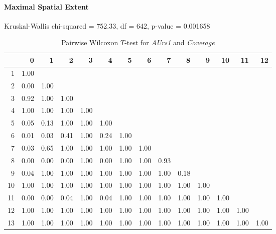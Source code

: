 \paragraph{Maximal Spatial Extent}
Kruskal-Wallis chi-squared = 752.33, df = 642, p-value = 0.001658

\begin{table}[ht]
	\small
	\centering
	\begin{tabular}{rrrrrrrrrrrrrr}
		\hline
	   & 0 & 1 & 2 & 3 & 4 & 5 & 6 & 7 & 8 & 9 & 10 & 11 & 12 \\ 
		\hline
	  1 & 1.00 &  &  &  &  &  &  &  &  &  &  &  &  \\ 
		2 & 0.00 & 1.00 &  &  &  &  &  &  &  &  &  &  &  \\ 
		3 & 0.92 & 1.00 & 1.00 &  &  &  &  &  &  &  &  &  &  \\ 
		4 & 1.00 & 1.00 & 1.00 & 1.00 &  &  &  &  &  &  &  &  &  \\ 
		5 & 0.05 & 0.13 & 1.00 & 1.00 & 1.00 &  &  &  &  &  &  &  &  \\ 
		6 & 0.01 & 0.03 & 0.41 & 1.00 & 0.24 & 1.00 &  &  &  &  &  &  &  \\ 
		7 & 0.03 & 0.65 & 1.00 & 1.00 & 1.00 & 1.00 & 1.00 &  &  &  &  &  &  \\ 
		8 & 0.00 & 0.00 & 0.00 & 1.00 & 0.00 & 1.00 & 1.00 & 0.93 &  &  &  &  &  \\ 
		9 & 0.04 & 1.00 & 1.00 & 1.00 & 1.00 & 1.00 & 1.00 & 1.00 & 0.18 &  &  &  &  \\ 
		10 & 1.00 & 1.00 & 1.00 & 1.00 & 1.00 & 1.00 & 1.00 & 1.00 & 1.00 & 1.00 &  &  &  \\ 
		11 & 0.00 & 0.00 & 0.04 & 1.00 & 0.04 & 1.00 & 1.00 & 1.00 & 1.00 & 1.00 & 1.00 &  &  \\ 
		12 & 1.00 & 1.00 & 1.00 & 1.00 & 1.00 & 1.00 & 1.00 & 1.00 & 1.00 & 1.00 & 1.00 & 1.00 &  \\ 
		13 & 1.00 & 1.00 & 1.00 & 1.00 & 1.00 & 1.00 & 1.00 & 1.00 & 1.00 & 1.00 & 1.00 & 1.00 & 1.00 \\ 
		 \hline
	  \end{tabular}
    \caption{Pairwise Wilcoxon $T$-test for \textit{AUrs1} and \textit{Coverage}}
    \label{tbl:wilcoxon_baysis_effector_AUrs1_Cov}
\end{table}
